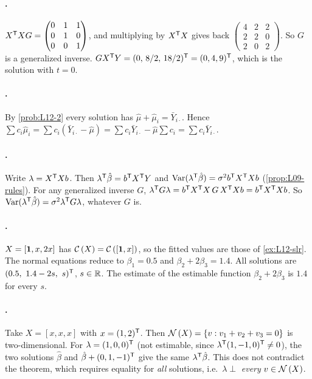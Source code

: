 \paragraph{.}
$X^{\mathsf T} XG=\begin{pmatrix}0&1&1\\0&1&0\\0&0&1\end{pmatrix}$, and multiplying by $X^{\mathsf T} X$ gives back
$\begin{pmatrix}4&2&2\\2&2&0\\2&0&2\end{pmatrix}$. So $G$ is a generalized inverse. $GX^{\mathsf T} Y=(0,\,8/2,\,18/2)^{\mathsf T}=(0,4,9)^{\mathsf T}$, which is
the solution with $t=0$.

\paragraph{.}
By \cref{prob:L12-2} every solution has $\hat\mu+\hat\mu_i=\bar Y_{i\cdot}$. Hence
$\sum c_i\hat\mu_i=\sum c_i(\bar Y_{i\cdot}-\hat\mu)=\sum c_i\bar Y_{i\cdot}-\hat\mu\sum c_i=\sum c_i\bar Y_{i\cdot}$.

\paragraph{.}
Write $\lambda=X^{\mathsf T} Xb$. Then $\lambda^{\mathsf T}\hat\beta=b^{\mathsf T} X^{\mathsf T} Y$ and
$\operatorname{Var}(\lambda^{\mathsf T}\hat\beta)=\sigma^2b^{\mathsf T} X^{\mathsf T} Xb$ (\cref{prop:L09-rules}). For any generalized inverse $G$,
$\lambda^{\mathsf T} G\lambda=b^{\mathsf T} X^{\mathsf T} X\,G\,X^{\mathsf T} Xb=b^{\mathsf T} X^{\mathsf T} Xb$. So $\operatorname{Var}(\lambda^{\mathsf T}\hat\beta)=\sigma^2\lambda^{\mathsf T} G\lambda$, whatever $G$ is.

\paragraph{.}
$X=[\mathbf 1,x,2x]$ has $\mathcal{C}\left(X\right)=\mathcal{C}\left([\mathbf 1,x]\right)$, so the fitted values are those of \cref{ex:L12-slr}. The normal equations
reduce to $\beta_1=0.5$ and $\beta_2+2\beta_3=1.4$. All solutions are $(0.5,\ 1.4-2s,\ s)\T$, $s\in\mathbb R$. The
estimate of the estimable function $\beta_2+2\beta_3$ is $1.4$ for every $s$.

\paragraph{.}
Take $X=[x,x,x]$ with $x=(1,2)^{\mathsf T}$. Then $\mathcal{N}\left(X\right)=\{v:v_1+v_2+v_3=0\}$ is two-dimensional. For
$\lambda=(1,0,0)^{\mathsf T}$ (not estimable, since $\lambda^{\mathsf T}(1,-1,0)^{\mathsf T}\ne0$), the two solutions $\hat\beta$ and $\hat\beta+(0,1,-1)^{\mathsf T}$ give
the same $\lambda^{\mathsf T}\hat\beta$. This does not contradict the theorem, which requires equality for \emph{all} solutions, i.e.\
$\lambda\perp$ \emph{every} $v\in\mathcal{N}\left(X\right)$.

